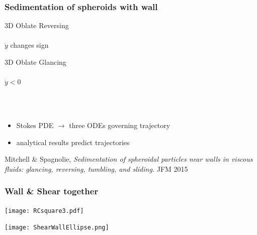 \documentclass{beamer}
\begin{document}
%  

\begin{frame}
\frametitle{Sedimentation of spheroids with wall}
\begin{minipage}{0.45\linewidth}
\begin{center}
3D Oblate Reversing\\
  \\
$\dot y$ changes sign
\end{center}
\end{minipage}
\;
\begin{minipage}{0.45\linewidth}
\begin{center}
3D Oblate Glancing\\
 \\
$\dot y < 0$ 
\end{center}
\end{minipage}\\
\ \\
\begin{itemize}
 \item Stokes PDE $\to$ three ODEs governing trajectory
 \item analytical results predict trajectories
\end{itemize}
{\footnotesize Mitchell \& Spagnolie, \emph{Sedimentation of spheroidal particles near walls in viscous fluids: glancing, reversing, tumbling, and sliding.}  JFM 2015}

\end{frame}

\begin{frame}
 \frametitle{Wall \& Shear together}
\begin{minipage}{0.45\linewidth}
\begin{center}
\texttt{[image: RCsquare3.pdf]}\\
\end{center}
\end{minipage}
\begin{minipage}{0.45\linewidth}
\begin{center}
\texttt{[image: ShearWallEllipse.png]}\\
\end{center}
\end{minipage}\\
\end{frame}
\end{document}
